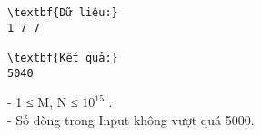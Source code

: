 \begin{verbatim}
\textbf{Dữ liệu:}
1 7 7

\textbf{Kết quả:}
5040
\end{verbatim}
- 1 ≤ M, N ≤ $10^{15}$   .   
\\   - Số dòng trong Input không vượt quá 5000.